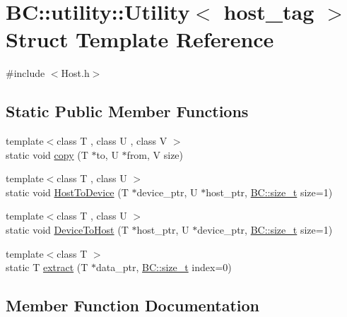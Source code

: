\hypertarget{structBC_1_1utility_1_1Utility_3_01host__tag_01_4}{}\section{BC\+:\+:utility\+:\+:Utility$<$ host\+\_\+tag $>$ Struct Template Reference}
\label{structBC_1_1utility_1_1Utility_3_01host__tag_01_4}


{\ttfamily \#include $<$Host.\+h$>$}

\subsection*{Static Public Member Functions}
\begin{DoxyCompactItemize}
\item 
{\footnotesize template$<$class T , class U , class V $>$ }\\static void \hyperlink{structBC_1_1utility_1_1Utility_3_01host__tag_01_4_a04c1e2a0802aa5b5566b0ca6a2f8bd5a}{copy} (T $\ast$to, U $\ast$from, V size)
\item 
{\footnotesize template$<$class T , class U $>$ }\\static void \hyperlink{structBC_1_1utility_1_1Utility_3_01host__tag_01_4_ab33f2f6c3f0c3cab1c2d5627eb0d3c3e}{Host\+To\+Device} (T $\ast$device\+\_\+ptr, U $\ast$host\+\_\+ptr, \hyperlink{namespaceBC_a6007cbc4eeec401a037b558910a56173}{B\+C\+::size\+\_\+t} size=1)
\item 
{\footnotesize template$<$class T , class U $>$ }\\static void \hyperlink{structBC_1_1utility_1_1Utility_3_01host__tag_01_4_a32fc4a864d170379eae4b66f27d5de9e}{Device\+To\+Host} (T $\ast$host\+\_\+ptr, U $\ast$device\+\_\+ptr, \hyperlink{namespaceBC_a6007cbc4eeec401a037b558910a56173}{B\+C\+::size\+\_\+t} size=1)
\item 
{\footnotesize template$<$class T $>$ }\\static T \hyperlink{structBC_1_1utility_1_1Utility_3_01host__tag_01_4_afd674efca2afb60a942fd26d3a45af8d}{extract} (T $\ast$data\+\_\+ptr, \hyperlink{namespaceBC_a6007cbc4eeec401a037b558910a56173}{B\+C\+::size\+\_\+t} index=0)
\end{DoxyCompactItemize}


\subsection{Member Function Documentation}
